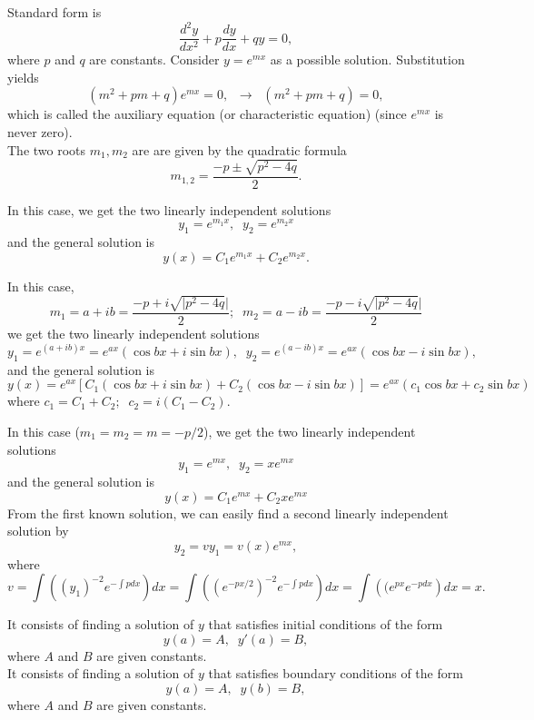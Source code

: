 \documentclass{article}
\begin{document}
\bigskip

Standard form is
$$
\frac{d^2 y}{dx^2} + p \frac{dy}{dx} + q  y = 0,
$$
where $p$ and $q$ are constants. Consider $ y=e^{mx}$ as a
possible solution. Substitution yields
$$
\left(m^2+ pm + q \right)e^{mx}=0, \;\;  \to \;\; \left(m^2+ pm +
q \right)=0,
$$
which is called the auxiliary equation (or characteristic
equation) (since $e^{mx}$ is never zero).\\
The two roots $m_1, m_2$ are are given by the quadratic formula
$$
m_{1,2} = \frac{ -p \pm \sqrt{p^2- 4q} }{2}.
$$

\bigskip
\hrulefill

 In this
case, we get the two linearly independent solutions
$$
y_1= e^{m_1 x}, \;\; y_2= e^{m_2 x}
$$
and the general solution is
$$
y(x)= C_1 e^{m_1 x} +C_2  e^{m_2 x}.
$$

\hrulefill

 In this
case,
$$
m_1=a+ib=\frac{ -p + i\sqrt{|p^2- 4q}| }{2}; \;\; m_2=a-ib=\frac{
-p - i\sqrt{|p^2- 4q}| }{2}
$$
we get the two linearly independent solutions
$$
y_1= e^{(a+ib) x}=e^{a x}( \cos bx +i \sin b x) , \;\; y_2=
e^{(a-ib) x}=e^{a x}( \cos bx -i \sin b x) , \;\;
$$
and the general solution is
$$
y(x)=e^{a x}\left[  C_1( \cos bx +i \sin b x)+ C_2( \cos bx -i
\sin b x) \right]=e^{a x}\left(  c_1 \cos bx +c_2 \sin b x \right)
$$
where $c_1=C_1+C_2; \;\; c_2=i(C_1-C_2)$.

\bigskip
\hrulefill

 In this case
($m_1=m_2=m=-p/2$), we get the two linearly independent solutions
$$
y_1= e^{m x}, \;\; y_2= x e^{m x}
$$
and the general solution is
$$
y(x)= C_1 e^{m x} +C_2 x e^{m x}
$$
From the first known solution, we can easily find a second
linearly independent solution by
$$
y_2=vy_1=v(x) e^{mx},
$$
where
$$
 v= \int \left( (y_1)^{-2}  e^{- \int p dx} \right) dx=
 \int \left( (e^{-px/2})^{-2}  e^{- \int p dx} \right) dx=
  \int \left( (e^{p x}  e^{-p dx} \right) dx=x.
$$

\bigskip

\newpage

 It consists of finding a
solution of $y$ that satisfies initial conditions of the form
$$
y(a)=A, \;\; y'(a)=B,
$$
where $A$ and $B$ are given constants. \\
 It consists of finding a
solution of $y$ that satisfies boundary conditions of the form
$$
y(a)=A, \;\; y(b)=B,
$$
where $A$ and $B$ are given constants.
\end{document}
